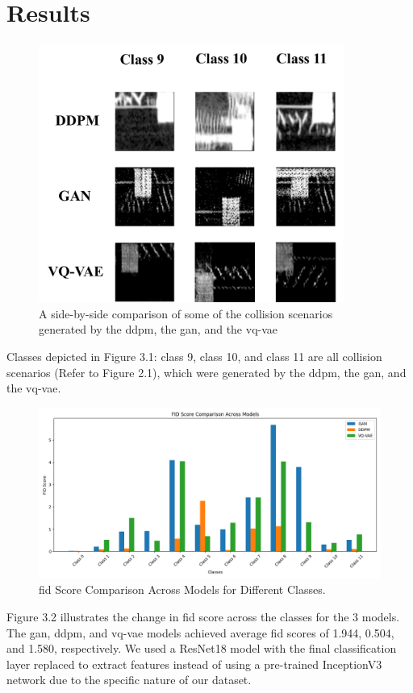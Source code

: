 \chapter{Results}
\label{chap:results}
\begin{figure}[h!]
\includegraphics[width=10cm]{figures/Picture7.png}
\centering
\caption{A side-by-side comparison of some of the collision scenarios generated by the \gls{ddpm}, the \gls{gan}, and the \gls{vq-vae} }
\centering
\end{figure}

Classes depicted in Figure 3.1: class 9, class 10, and class 11 are all collision scenarios (Refer to Figure 2.1), which were generated by the 
\gls{ddpm}, the \gls{gan}, and the \gls{vq-vae}. 

\begin{figure}[ht]
    \centering
    \includegraphics[width=\textwidth]{figures/Figure_12.png} 
    \caption{\gls{fid} Score Comparison Across Models for Different Classes.}
    \label{fig:fid_scores}
\end{figure}
Figure 3.2 illustrates the change in \gls{fid} score across the classes for the 3 models.  The \gls{gan}, \gls{ddpm}, and \gls{vq-vae} models achieved 
average \gls{fid} scores of 1.944, 0.504, and 1.580, respectively. We used a ResNet18 model with the final classification layer replaced to extract 
features instead of using a pre-trained InceptionV3 network due to the specific nature of our dataset.

